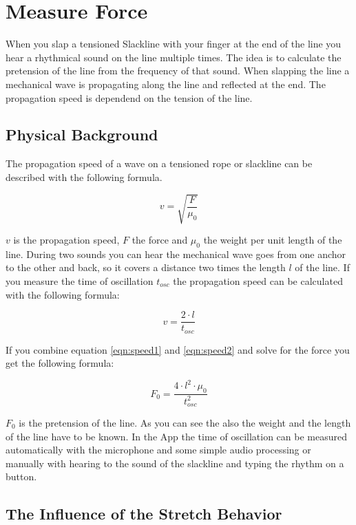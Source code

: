 \chapter{Measure Force}

When you slap a tensioned Slackline with your finger at the end of the line you hear a rhythmical sound on the line multiple times. The idea is to calculate the pretension of the line from the frequency of that sound. When slapping the line a mechanical wave is propagating along the line and reflected at the end. The propagation speed is dependend on the tension of the line.

\section{Physical Background}

The propagation speed of a wave on a tensioned rope or slackline can be described with the following formula.

\begin{equation}
v = \sqrt{\frac{F}{\mu_0}}
\label{eqn:speed1}
\end{equation}

$v$ is the propagation speed, $F$ the force and $\mu_0$ the weight per unit length of the line. During two sounds you can hear the mechanical wave goes from one anchor to the other and back, so it covers a distance two times the length $l$ of the line. If you measure the time of oscillation $t_{osc}$ the propagation speed can be calculated with the following formula:

\begin{equation}
	v = \frac{2\cdot l}{t_{osc}}
	\label{eqn:speed2}
\end{equation}

If you combine equation \ref{eqn:speed1} and \ref{eqn:speed2} and solve for the force you get the following formula:

\begin{equation}
	F_0 = \frac{4\cdot l^2\cdot \mu_0}{t_{osc}^2}
	\label{eqn:measureForce}
\end{equation}

$F_0$ is the pretension of the line. As you can see the also the weight and the length of the line have to be known. In the App the time of oscillation can be measured automatically with the microphone and some simple audio processing or manually with hearing to the sound of the slackline and typing the rhythm on a button. 

\section{The Influence of the Stretch Behavior}

